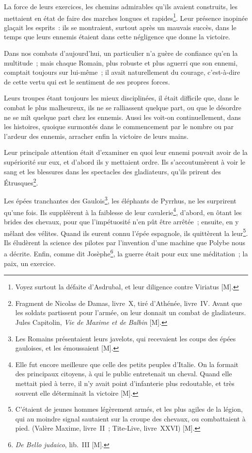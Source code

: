 \documentclass[french,twoside]{book} %
\begin{document}
La force de leurs exercices, les chemins admirables qu’ils avaient construits, les mettaient en état de faire des marches longues et rapides\footnote{Voyez surtout la défaite d’Asdrubal, et leur diligence contre Viriatus [M].}. Leur présence inopinée glaçait les esprits : ils se montraient, surtout après un mauvais succès, dans le temps que leurs ennemis étaient dans cette négligence que donne la victoire.\par
Dans nos combats d’aujourd’hui, un particulier n’a guère de confiance qu’en la multitude ; mais chaque Romain, plus robuste et plus aguerri que son ennemi, comptait toujours sur lui-même ; il avait naturellement du courage, c’est-à-dire de cette vertu qui est le sentiment de ses propres forces.\par
Leurs troupes étant toujours les mieux disciplinées, il était difficile que, dans le combat le plus malheureux, ils ne se ralliassent quelque part, ou que le désordre ne se mît quelque part chez les ennemis. Aussi les voit-on continuellement, dans les histoires, quoique surmontés dans le commencement par le nombre ou par l’ardeur des ennemis, arracher enfin la victoire de leurs mains.\par
Leur principale attention était d’examiner en quoi leur ennemi pouvait avoir de la supériorité sur eux, et d’abord ils y mettaient ordre. Ils s’accoutumèrent à voir le sang et les blessures dans les spectacles des gladiateurs, qu’ils prirent des Étrusques\footnote{Fragment de Nicolas de Damas, livre X, tiré d’Athénée, livre IV. Avant que les soldats partissent pour l’armée, on leur donnait un combat de gladiateurs. Jules Capitolin, {\itshape Vie de Maxime et de Balbin} [M].}.\par
Les épées tranchantes des Gaulois\footnote{Les Romains présentaient leurs javelots, qui recevaient les coups des épées gauloises, et les émoussaient [M].}, les éléphants de Pyrrhus, ne les surprirent qu’une fois. Ils suppléèrent à la faiblesse de leur cavalerie\footnote{Elle fut encore meilleure que celle des petits peuples d’Italie. On la formait des principaux citoyens, à qui le public entretenait un cheval. Quand elle mettait pied à terre, il n’y avait point d’infanterie plus redoutable, et très souvent elle déterminait la victoire [M].}, d’abord, en ôtant les brides des chevaux, pour que l’impétuosité n’en pût être arrêtée ; ensuite, en y mêlant des vélites. Quand ils eurent connu l’épée espagnole, ils quittèrent la leur\footnote{C’étaient de jeunes hommes légèrement armés, et les plus agiles de la légion, qui au moindre signal sautaient sur la croupe des chevaux, ou combattaient à pied. (Valère Maxime, livre II ; Tite-Live, livre XXVI) [M].}. Ils éludèrent la science des pilotes par l’invention d’une machine que Polybe nous a décrite. Enfin, comme dit Josèphe\footnote{{\itshape De Bello judaico}, lib. III [M].}, la guerre était pour eux une méditation ; la paix, un exercice.\par
\end{document}
